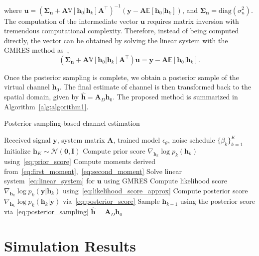\documentclass[lettersize,journal]{IEEEtran}
\begin{document}
where $\mathbf{u} = (\boldsymbol{\Sigma}_{\mathbf{n}}+\mathbf{A}\mathbb{V}[\mathbf{h}_{0}|\mathbf{h}_{k}]\mathbf{A}^{\top})^{-1}(\mathbf{y}- \mathbf{A}\mathbb{E}[\mathbf{h}_{0}|\mathbf{h}_{k}])$, and $\boldsymbol{\Sigma}_{\mathbf{n}} = \text{diag}(\sigma_{n}^{2})$. The computation of the intermediate vector $\mathbf{u}$ requires matrix inversion with tremendous computational complexity. Therefore, instead of being computed directly, the vector can be obtained by solving the linear system with the GMRES method as~\cite{saadGMRESGeneralizedMinimal1986},
\begin{equation}
\label{eq:linear_system}
(\boldsymbol{\Sigma}_{\mathbf{n}}+\mathbf{A}\mathbb{V}[\mathbf{h}_{0}|\mathbf{h}_{k}]\mathbf{A}^{\top})\mathbf{u} = \mathbf{y}- \mathbf{A}\mathbb{E}[\mathbf{h}_{0}|\mathbf{h}_{k}].
\end{equation}

Once the posterior sampling is complete, we obtain a posterior sample of the virtual channel $\mathbf{h}_{0}$. The final estimate of channel is then transformed back to the spatial domain, given by $\hat{\mathbf{h}} = \mathbf{A}_{D}\mathbf{h}_{0}$. The proposed method is summarized in Algorithm~\ref{alg:algorithm1}.

\begin{algorithm}[!t]
\caption{Posterior sampling-based channel estimation}
\label{alg:algorithm1}
\begin{algorithmic}[1]
\REQUIRE Received signal $\mathbf{y}$, system matrix $\mathbf{A}$, trained model $\epsilon_{\theta}$, noise schedule $\{\beta_{k}\}_{k=1}^{K}$
\STATE Initialize $\mathbf{h}_K \sim \mathcal{N}(\mathbf{0}, \mathbf{I})$
	\STATE Compute prior score $\nabla_{\mathbf{h}_{k}}\log p_{k}(\mathbf{h}_{k})$ using~\eqref{eq:prior_score}
	\STATE Compute moments derived from~\eqref{eq:first_moment},~\eqref{eq:second_moment}
	\STATE Solve linear system~\eqref{eq:linear_system} for $\mathbf{u}$ using GMRES
	\STATE Compute likelihood score $\nabla_{\mathbf{h}_{k}}\log p_{k}(\mathbf{y}|\mathbf{h}_{k})$ using~\eqref{eq:likelihood_score_approx}
	\STATE Compute posterior score $\nabla_{\mathbf{h}_{k}}\log p_{k}(\mathbf{h}_{k}|\mathbf{y})$ via~\eqref{eq:posterior_score}
	\STATE Sample $\mathbf{h}_{k-1}$ using the posterior score via~\eqref{eq:posterior_sampling}
\ENDFOR
\RETURN $\hat{\mathbf{h}} = \mathbf{A}_{D}\mathbf{h}_{0}$
\end{algorithmic}
\end{algorithm}

\section{Simulation Results}
\end{document}
